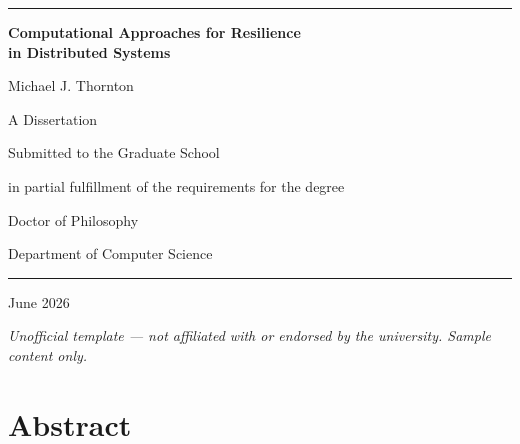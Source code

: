 \documentclass[12pt,letterpaper,oneside]{report}
\begin{document}
\begin{titlepage}
\centering
\vspace*{0pt}

{\color{nuPurple}\rule{\textwidth}{2pt}\par}
\vspace{40pt}

{\Huge\bfseries\color{nuDark}Computational Approaches for Resilience\\[8pt]
in Distributed Systems\par}

\vspace{30pt}

{\Large\color{nuGray}Michael J. Thornton\par}

\vspace{20pt}

{\large\color{nuGray}A Dissertation\par}
{\color{nuGray}Submitted to the Graduate School\par}
{\color{nuGray}in partial fulfillment of the requirements for the degree\par}

\vspace{20pt}

{\Large\color{nuDark}Doctor of Philosophy\par}

\vspace{10pt}

{\large\color{nuGray}Department of Computer Science\par}

\vspace{40pt}

{\color{nuPurple}\rule{\textwidth}{1pt}\par}
\vspace{20pt}

{\large\color{nuGray}June 2026\par}

\vfill

{\footnotesize\color{nuGray!70}\textit{Unofficial template --- not affiliated with or endorsed by the university. Sample content only.}\par}
\end{titlepage}


\chapter*{Abstract}
\end{document}
